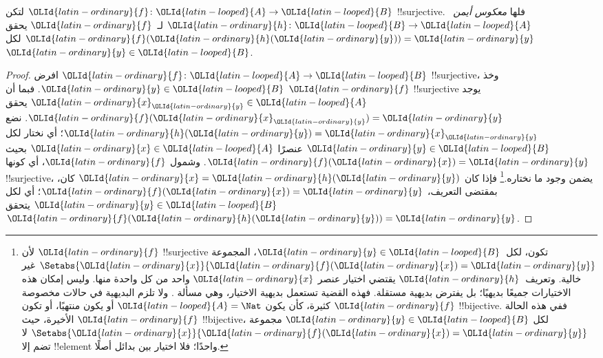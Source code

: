 \documentclass[../../../include/open-logic-section]{subfiles}
\begin{document}
\begin{prop}
لتكن ${\OLId{latin-ordinary}{f}}\colon {\OLId{latin-looped}{A}} \to {\OLId{latin-looped}{B}}$ !!{surjective}. فلها \emph{معكوس أيمن}~${\OLId{latin-ordinary}{h}}\colon {\OLId{latin-looped}{B}} \to {\OLId{latin-looped}{A}}$
لـ~${\OLId{latin-ordinary}{f}}$ يحقق ${\OLId{latin-ordinary}{f}}({\OLId{latin-ordinary}{h}}({\OLId{latin-ordinary}{y}})) = {\OLId{latin-ordinary}{y}}$ لكل~${\OLId{latin-ordinary}{y}} \in {\OLId{latin-looped}{B}}$.
\end{prop}

\begin{proof}
افرض ${\OLId{latin-ordinary}{f}}\colon {\OLId{latin-looped}{A}} \to {\OLId{latin-looped}{B}}$ !!{surjective}، وخذ ${\OLId{latin-ordinary}{y}} \in {\OLId{latin-looped}{B}}$.
فبما أن ${\OLId{latin-ordinary}{f}}$ !!{surjective} يوجد ${\OLId{latin-ordinary}{x}}_{\OLId{latin-ordinary}{y}} \in {\OLId{latin-looped}{A}}$ يحقق ${\OLId{latin-ordinary}{f}}({\OLId{latin-ordinary}{x}}_{\OLId{latin-ordinary}{y}}) = {\OLId{latin-ordinary}{y}}$.
نضع ${\OLId{latin-ordinary}{h}}({\OLId{latin-ordinary}{y}}) = {\OLId{latin-ordinary}{x}}_{\OLId{latin-ordinary}{y}}$؛ أي نختار لكل ${\OLId{latin-ordinary}{y}} \in {\OLId{latin-looped}{B}}$ عنصرًا ${\OLId{latin-ordinary}{x}} \in {\OLId{latin-looped}{A}}$
بحيث ${\OLId{latin-ordinary}{f}}({\OLId{latin-ordinary}{x}}) = {\OLId{latin-ordinary}{y}}$. وشمول ${\OLId{latin-ordinary}{f}}$، أي كونها !!{surjective}، يضمن
وجود ما نختاره.\footnote{لأن ${\OLId{latin-ordinary}{f}}$ !!{surjective} تكون، لكل~${\OLId{latin-ordinary}{y}} \in {\OLId{latin-looped}{B}}$،
المجموعة $\Setabs{{\OLId{latin-ordinary}{x}}}{{\OLId{latin-ordinary}{f}}({\OLId{latin-ordinary}{x}}) = {\OLId{latin-ordinary}{y}}}$ غير خالية. وتعريف~${\OLId{latin-ordinary}{h}}$ يقتضي اختيار
عنصر ${\OLId{latin-ordinary}{x}}$ واحد من كل واحدة منها. وليس إمكان هذه الاختيارات جميعًا
بديهيًا؛ بل يفترض بديهية مستقلة. فهذه القضية تستعمل بديهية
الاختيار، وهي مسألة .
ولا تلزم البديهية في حالات مخصوصة كثيرة، كأن يكون ${\OLId{latin-looped}{A}} = \Nat$
أو يكون منتهيًا، أو تكون ${\OLId{latin-ordinary}{f}}$ !!{bijective}. ففي هذه الحالة
الأخيرة، حيث ${\OLId{latin-ordinary}{f}}$ !!{bijective}، لكل ${\OLId{latin-ordinary}{y}} \in {\OLId{latin-looped}{B}}$ مجموعة
$\Setabs{{\OLId{latin-ordinary}{x}}}{{\OLId{latin-ordinary}{f}}({\OLId{latin-ordinary}{x}}) = {\OLId{latin-ordinary}{y}}}$ لا تضم إلا !!{element} واحدًا؛ فلا اختيار
بين بدائل أصلًا.}
فإذا كان ${\OLId{latin-ordinary}{x}} = {\OLId{latin-ordinary}{h}}({\OLId{latin-ordinary}{y}})$ كان، بمقتضى التعريف، ${\OLId{latin-ordinary}{f}}({\OLId{latin-ordinary}{x}}) = {\OLId{latin-ordinary}{y}}$؛ أي لكل
${\OLId{latin-ordinary}{y}} \in {\OLId{latin-looped}{B}}$ يتحقق ${\OLId{latin-ordinary}{f}}({\OLId{latin-ordinary}{h}}({\OLId{latin-ordinary}{y}})) = {\OLId{latin-ordinary}{y}}$.
\end{proof}
\end{document}

